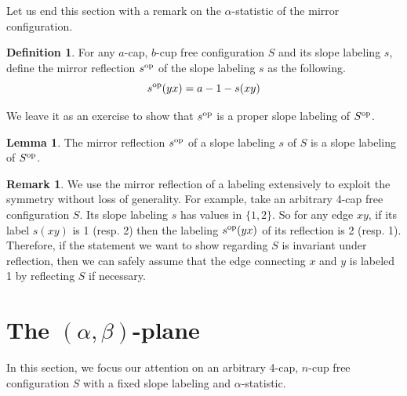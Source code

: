 \documentclass{amsart}
\newcommand{\txt}[1]{\textnormal{#1}}
\newcommand{\op}{\txt{op}}
\theoremstyle{definition}
\newtheorem{lemma}[thm]{Lemma}
\newtheorem{definition}[thm]{Definition}
\newtheorem{remark}[thm]{Remark}
\numberwithin{thm}{section}
\begin{document}
Let us end this section with a remark on the $\alpha$-statistic of the mirror configuration.
\begin{definition}
For any $a$-cap, $b$-cup free configuration $S$ and its slope labeling $s$, define the mirror reflection $s^\op$ of the slope labeling $s$ as the following.
$$s^{\op}(yx) = a - 1 -  s(xy)$$
\end{definition}
We leave it as an exercise to show that $s^\op$ is a proper slope labeling of $S^\op$.
\begin{lemma}
The mirror reflection $s^\op$ of a slope labeling $s$ of $S$ is a slope labeling of $S^\op$.
\end{lemma}
\begin{remark}
\label{rem:4cap-mirror}
We use the mirror reflection of a labeling extensively to exploit the symmetry without loss of generality. 
For example, take an arbitrary 4-cap free configuration $S$. Its slope labeling $s$ has values in $\{1, 2\}$. So for any edge $xy$, if its label $s(xy)$ is 1 (resp. 2) then the labeling $s^\op(yx)$ of its reflection is 2 (resp. 1).
Therefore, if the statement we want to show regarding $S$ is invariant under reflection,
then we can safely assume that the edge connecting $x$ and $y$ is labeled 1 by reflecting $S$ if necessary.
\end{remark}

\section{The $(\alpha, \beta)$-plane}
\label{sec:alpha-beta}
In this section, we focus our attention on an arbitrary 4-cap, $n$-cup free configuration $S$ with a fixed slope labeling and $\alpha$-statistic.
\end{document}
